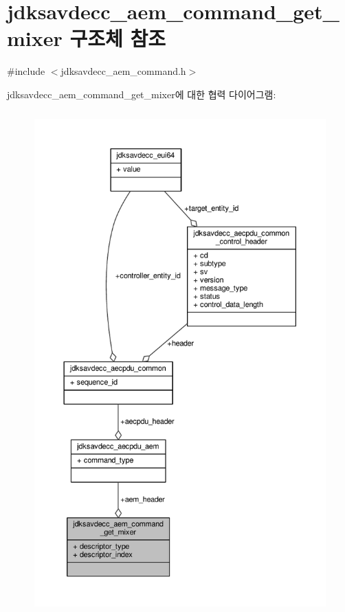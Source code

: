 \hypertarget{structjdksavdecc__aem__command__get__mixer}{}\section{jdksavdecc\+\_\+aem\+\_\+command\+\_\+get\+\_\+mixer 구조체 참조}
\label{structjdksavdecc__aem__command__get__mixer}


{\ttfamily \#include $<$jdksavdecc\+\_\+aem\+\_\+command.\+h$>$}



jdksavdecc\+\_\+aem\+\_\+command\+\_\+get\+\_\+mixer에 대한 협력 다이어그램\+:
\nopagebreak
\begin{figure}[H]
\begin{center}
\leavevmode
\includegraphics[height=550pt]{structjdksavdecc__aem__command__get__mixer__coll__graph}
\end{center}
\end{figure}
